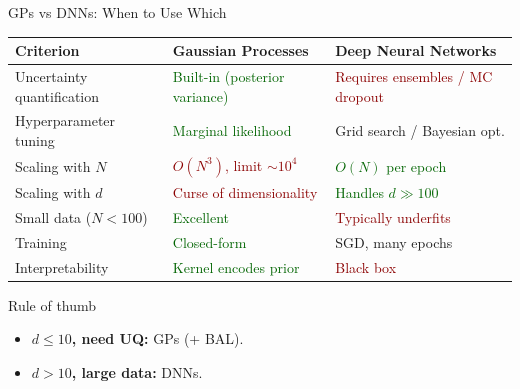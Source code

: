 \documentclass[aspectratio=169,11pt]{beamer}
\begin{document}
\begin{frame}{GPs vs DNNs: When to Use Which}
\begin{center}
\footnotesize
\setlength{\tabcolsep}{4pt}
\begin{tabular}{l l l}
\toprule
\textbf{Criterion} & \textbf{Gaussian Processes} & \textbf{Deep Neural Networks} \\
\midrule
Uncertainty quantification & \textcolor{darkgreen}{Built-in (posterior variance)} & \textcolor{darkred}{Requires ensembles / MC dropout} \\
Hyperparameter tuning & \textcolor{darkgreen}{Marginal likelihood} & \textcolor{softorange}{Grid search / Bayesian opt.} \\
Scaling with $N$ & \textcolor{darkred}{$O(N^3)$, limit $\sim 10^4$} & \textcolor{darkgreen}{$O(N)$ per epoch} \\
Scaling with $d$ & \textcolor{darkred}{Curse of dimensionality} & \textcolor{darkgreen}{Handles $d \gg 100$} \\
Small data ($N < 100$) & \textcolor{darkgreen}{Excellent} & \textcolor{darkred}{Typically underfits} \\
Training & \textcolor{darkgreen}{Closed-form} & \textcolor{softorange}{SGD, many epochs} \\
Interpretability & \textcolor{darkgreen}{Kernel encodes prior} & \textcolor{darkred}{Black box} \\
\bottomrule
\end{tabular}
\end{center}

\vspace{0.3cm}
\begin{alertblock}{Rule of thumb}
{\small
\begin{itemize}\itemsep0pt
  \item \textbf{$d \leq 10$, need UQ:} GPs (+ BAL).
  \item \textbf{$d > 10$, large data:} DNNs.
\end{itemize}}
\end{alertblock}
\end{frame}
\end{document}
